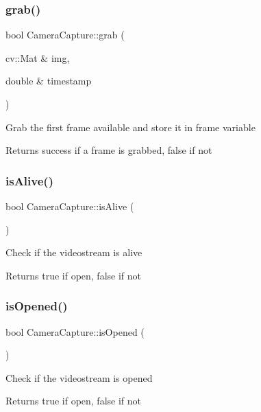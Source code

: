 \subsubsection{\texorpdfstring{grab()}{grab()}}
{\footnotesize\ttfamily bool Camera\+Capture\+::grab (\begin{DoxyParamCaption}\item[{cv\+::\+Mat \&}]{img,  }\item[{double \&}]{timestamp }\end{DoxyParamCaption})}

Grab the first frame available and store it in frame variable \begin{DoxyReturn}{Returns}
success if a frame is grabbed, false if not 
\end{DoxyReturn}
\mbox{\label{class_camera_capture_a1735b9892d336c6591ef932a9516af1c}} 
\subsubsection{\texorpdfstring{isAlive()}{isAlive()}}
{\footnotesize\ttfamily bool Camera\+Capture\+::is\+Alive (\begin{DoxyParamCaption}{ }\end{DoxyParamCaption})}

Check if the videostream is alive \begin{DoxyReturn}{Returns}
true if open, false if not 
\end{DoxyReturn}
\mbox{\label{class_camera_capture_aee6826fb71be8027ba4e421d5e52e719}} 
\subsubsection{\texorpdfstring{isOpened()}{isOpened()}}
{\footnotesize\ttfamily bool Camera\+Capture\+::is\+Opened (\begin{DoxyParamCaption}{ }\end{DoxyParamCaption})}

Check if the videostream is opened \begin{DoxyReturn}{Returns}
true if open, false if not 
\end{DoxyReturn}
\mbox{\label{class_camera_capture_a69ae39c83c49aa213df7a93487e8f17f}} 
